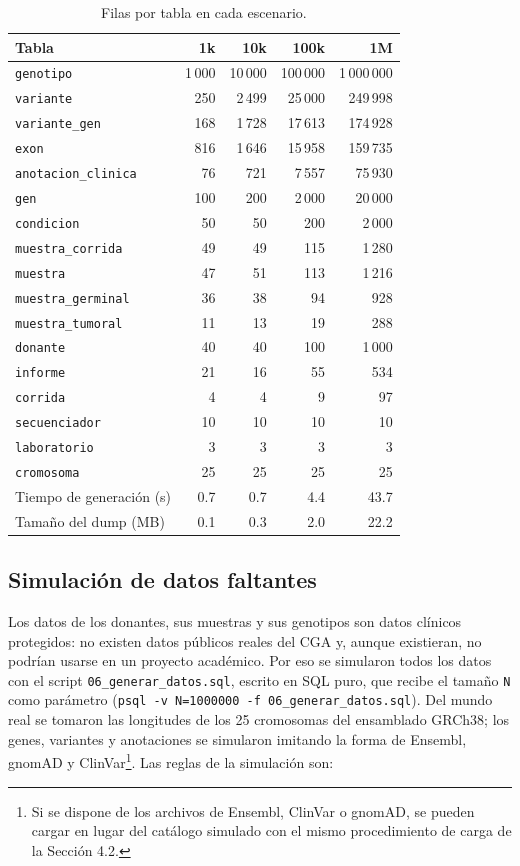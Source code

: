 \begin{table}[H]
\centering\small
\begin{tabular}{@{}lrrrr@{}}
\toprule
Tabla & 1k & 10k & 100k & 1M \\
\midrule
\texttt{genotipo} & 1\,000 & 10\,000 & 100\,000 & 1\,000\,000 \\
\texttt{variante} & 250 & 2\,499 & 25\,000 & 249\,998 \\
\texttt{variante\_\allowbreak{}gen} & 168 & 1\,728 & 17\,613 & 174\,928 \\
\texttt{exon} & 816 & 1\,646 & 15\,958 & 159\,735 \\
\texttt{anotacion\_\allowbreak{}clinica} & 76 & 721 & 7\,557 & 75\,930 \\
\texttt{gen} & 100 & 200 & 2\,000 & 20\,000 \\
\texttt{condicion} & 50 & 50 & 200 & 2\,000 \\
\texttt{muestra\_\allowbreak{}corrida} & 49 & 49 & 115 & 1\,280 \\
\texttt{muestra} & 47 & 51 & 113 & 1\,216 \\
\texttt{muestra\_\allowbreak{}germinal} & 36 & 38 & 94 & 928 \\
\texttt{muestra\_\allowbreak{}tumoral} & 11 & 13 & 19 & 288 \\
\texttt{donante} & 40 & 40 & 100 & 1\,000 \\
\texttt{informe} & 21 & 16 & 55 & 534 \\
\texttt{corrida} & 4 & 4 & 9 & 97 \\
\texttt{secuenciador} & 10 & 10 & 10 & 10 \\
\texttt{laboratorio} & 3 & 3 & 3 & 3 \\
\texttt{cromosoma} & 25 & 25 & 25 & 25 \\
\midrule
Tiempo de generación (s) & 0.7 & 0.7 & 4.4 & 43.7 \\
Tamaño del dump (MB) & 0.1 & 0.3 & 2.0 & 22.2 \\
\bottomrule
\end{tabular}
\caption{Filas por tabla en cada escenario.}
\label{tab:conteos}
\end{table}

\subsection{Simulación de datos faltantes}\label{sec:simulacion}

Los datos de los donantes, sus muestras y sus genotipos son datos clínicos protegidos: no existen datos
públicos reales del CGA y, aunque existieran, no podrían usarse en un proyecto académico. Por eso se
simularon todos los datos con el script \texttt{06\_\allowbreak{}generar\_\allowbreak{}datos.sql}, escrito en SQL puro, que recibe el
tamaño \texttt{N} como parámetro (\texttt{psql -v N=1000000 -f 06\_\allowbreak{}generar\_\allowbreak{}datos.sql}). Del mundo real se tomaron
las longitudes de los 25 cromosomas del ensamblado GRCh38; los genes, variantes y anotaciones se simularon
imitando la forma de Ensembl, gnomAD y ClinVar\footnote{Si se dispone de los archivos de Ensembl, ClinVar o gnomAD,
se pueden cargar en lugar del catálogo simulado con el mismo procedimiento de carga de la Sección 4.2.}. Las
reglas de la simulación son:

